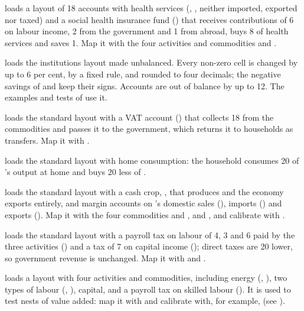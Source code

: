 \begin{optdesc}
\item[\opt{}{health}] loads a layout of 18 accounts with health services
(, , neither imported, exported nor taxed) and a
social health insurance fund () that receives contributions of 6 on
labour income, 2 from the government and 1 from abroad, buys 8 of health
services and saves 1. Map it with the four activities and commodities and
.

\item[\opt{unb}{alanced}] loads the institutions layout made unbalanced.
Every non-zero cell is changed by up to 6 per cent, by a fixed rule, and
rounded to four decimals; the negative savings of  and  keep
their signs. Accounts are out of balance by up to 12. The examples and tests of
 use it.

\item[\opt{}{vat}] loads the standard layout with a VAT account
() that collects 18 from the commodities and passes it to the
government, which returns it to households as transfers. Map it with
.

\item[\opt{}{home}] loads the standard layout with home consumption: the
household consumes 20 of 's output at home and buys 20 less of
.

\item[\opt{}{trade}] loads the standard layout with a cash crop,
, that  produces and the economy exports entirely,
and margin accounts on 's domestic sales (), imports
() and exports (). Map it with the four commodities and
,  and
, and calibrate with .

\item[\opt{factort}{ax}] loads the standard layout with a payroll tax on labour
of 4, 3 and 6 paid by the three activities () and a tax of 7 on
capital income (); direct taxes are 20 lower, so government
revenue is unchanged. Map it with  and
.

\item[\opt{nest}{s}] loads a layout with four activities and commodities,
including energy (, ), two types of labour
(, ), capital, and a payroll tax on skilled labour
(). It is used to test nests of value added: map it with
 and calibrate with, for example,
{\frenchspacing{}} (see
).
\end{optdesc}

